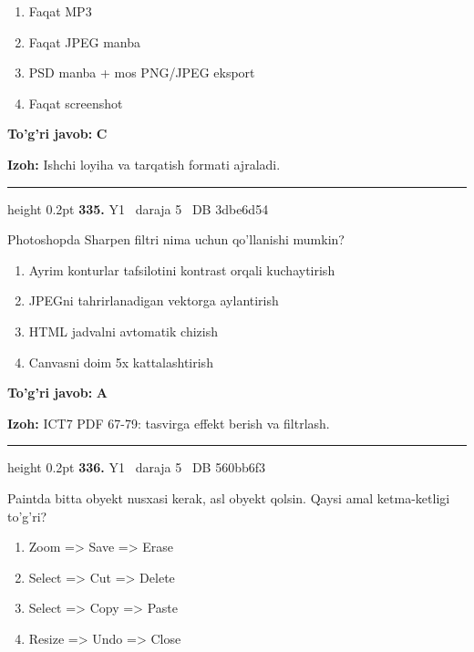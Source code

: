 \documentclass[10pt,a4paper,oneside]{article}
\begin{document}
\begin{enumerate}[label=\Alph*),leftmargin=9mm]
\item Faqat MP3
\item Faqat JPEG manba
\item PSD manba + mos PNG/JPEG eksport
\item Faqat screenshot
\end{enumerate}
\begin{tcolorbox}[enhanced,breakable,colback=teal!4,colframe=teal!45!black,boxrule=0.45pt,arc=1.2mm,left=2.8mm,right=2.8mm,top=2mm,bottom=2mm,before skip=2mm,after skip=2mm]
\textbf{\color{teal}To'g'ri javob:} \textbf{C}
\par\smallskip
\textbf{Izoh:} Ishchi loyiha va tarqatish formati ajraladi.
\end{tcolorbox}
\vspace{2mm}\hrule height 0.2pt \vspace{4mm}
\hypertarget{q335}{\textbf{\color{ink}335.}}  {\color{muted}\scriptsize Y1 \textbullet\ daraja 5 \textbullet\ DB 3dbe6d54}
\par
Photoshopda Sharpen filtri nima uchun qo'llanishi mumkin?
\begin{enumerate}[label=\Alph*),leftmargin=9mm]
\item Ayrim konturlar tafsilotini kontrast orqali kuchaytirish
\item JPEGni tahrirlanadigan vektorga aylantirish
\item HTML jadvalni avtomatik chizish
\item Canvasni doim 5x kattalashtirish
\end{enumerate}
\begin{tcolorbox}[enhanced,breakable,colback=teal!4,colframe=teal!45!black,boxrule=0.45pt,arc=1.2mm,left=2.8mm,right=2.8mm,top=2mm,bottom=2mm,before skip=2mm,after skip=2mm]
\textbf{\color{teal}To'g'ri javob:} \textbf{A}
\par\smallskip
\textbf{Izoh:} ICT7 PDF 67-79: tasvirga effekt berish va filtrlash.
\end{tcolorbox}
\vspace{2mm}\hrule height 0.2pt \vspace{4mm}
\hypertarget{q336}{\textbf{\color{ink}336.}}  {\color{muted}\scriptsize Y1 \textbullet\ daraja 5 \textbullet\ DB 560bb6f3}
\par
Paintda bitta obyekt nusxasi kerak, asl obyekt qolsin. Qaysi amal ketma-ketligi to'g'ri?
\begin{enumerate}[label=\Alph*),leftmargin=9mm]
\item Zoom =\textgreater{} Save =\textgreater{} Erase
\item Select =\textgreater{} Cut =\textgreater{} Delete
\item Select =\textgreater{} Copy =\textgreater{} Paste
\item Resize =\textgreater{} Undo =\textgreater{} Close
\end{enumerate}
\end{document}
